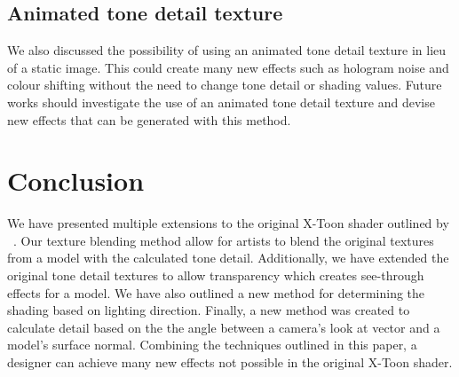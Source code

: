 \documentclass[annual]{acmsiggraph}
\begin{document}
\subsection{Animated tone detail texture}
We also discussed the possibility of using an animated tone detail texture in lieu of a static image. This could create many new effects such as hologram noise and colour shifting without the need to change tone detail or shading values. Future works should investigate the use of an animated tone detail texture and devise new effects that can be generated with this method.

\section{Conclusion}
\label{sec:conclusion}
We have presented multiple extensions to the original X-Toon shader outlined by ~\cite{BTM06a}. Our texture blending method allow for artists to blend the original textures from a model with the calculated tone detail. Additionally, we have extended the original tone detail textures to allow transparency which creates see-through effects for a model. We have also outlined a new method for determining the shading based on lighting direction. Finally, a new method was created to calculate detail based on the the angle between a camera's look at vector and a model's surface normal. Combining the techniques outlined in this paper, a designer can achieve many new effects not possible in the original X-Toon shader.



\end{document}
